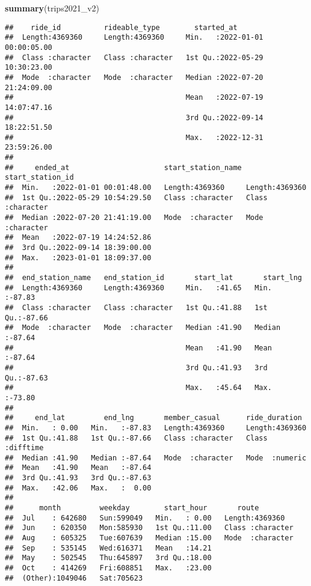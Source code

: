 \documentclass[
]{article}
\newenvironment{Shaded}{\begin{snugshade}}{\end{snugshade}}
\newcommand{\FunctionTok}[1]{\textcolor[rgb]{0.13,0.29,0.53}{\textbf{#1}}}
\newcommand{\NormalTok}[1]{#1}
\begin{document}
\begin{Shaded}
\begin{Highlighting}[]
\FunctionTok{summary}\NormalTok{(trips2021\_v2)}
\end{Highlighting}
\end{Shaded}

\begin{verbatim}
##    ride_id          rideable_type        started_at                    
##  Length:4369360     Length:4369360     Min.   :2022-01-01 00:00:05.00  
##  Class :character   Class :character   1st Qu.:2022-05-29 10:30:23.00  
##  Mode  :character   Mode  :character   Median :2022-07-20 21:24:09.00  
##                                        Mean   :2022-07-19 14:07:47.16  
##                                        3rd Qu.:2022-09-14 18:22:51.50  
##                                        Max.   :2022-12-31 23:59:26.00  
##                                                                        
##     ended_at                      start_station_name start_station_id  
##  Min.   :2022-01-01 00:01:48.00   Length:4369360     Length:4369360    
##  1st Qu.:2022-05-29 10:54:29.50   Class :character   Class :character  
##  Median :2022-07-20 21:41:19.00   Mode  :character   Mode  :character  
##  Mean   :2022-07-19 14:24:52.86                                        
##  3rd Qu.:2022-09-14 18:39:00.00                                        
##  Max.   :2023-01-01 18:09:37.00                                        
##                                                                        
##  end_station_name   end_station_id       start_lat       start_lng     
##  Length:4369360     Length:4369360     Min.   :41.65   Min.   :-87.83  
##  Class :character   Class :character   1st Qu.:41.88   1st Qu.:-87.66  
##  Mode  :character   Mode  :character   Median :41.90   Median :-87.64  
##                                        Mean   :41.90   Mean   :-87.64  
##                                        3rd Qu.:41.93   3rd Qu.:-87.63  
##                                        Max.   :45.64   Max.   :-73.80  
##                                                                        
##     end_lat         end_lng       member_casual      ride_duration    
##  Min.   : 0.00   Min.   :-87.83   Length:4369360     Length:4369360   
##  1st Qu.:41.88   1st Qu.:-87.66   Class :character   Class :difftime  
##  Median :41.90   Median :-87.64   Mode  :character   Mode  :numeric   
##  Mean   :41.90   Mean   :-87.64                                       
##  3rd Qu.:41.93   3rd Qu.:-87.63                                       
##  Max.   :42.06   Max.   :  0.00                                       
##                                                                       
##      month         weekday        start_hour       route          
##  Jul    : 642680   Sun:599049   Min.   : 0.00   Length:4369360    
##  Jun    : 620350   Mon:585930   1st Qu.:11.00   Class :character  
##  Aug    : 605325   Tue:607639   Median :15.00   Mode  :character  
##  Sep    : 535145   Wed:616371   Mean   :14.21                     
##  May    : 502545   Thu:645897   3rd Qu.:18.00                     
##  Oct    : 414269   Fri:608851   Max.   :23.00                     
##  (Other):1049046   Sat:705623
\end{verbatim}
\end{document}
